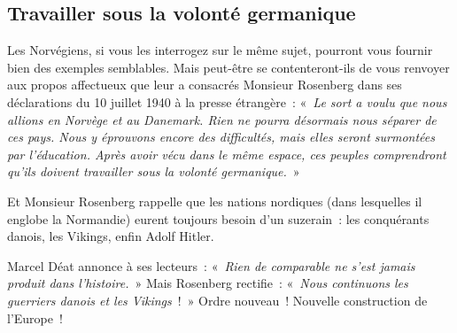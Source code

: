 \documentclass[french,twoside]{book} %
\begin{document}
\subsection[Travailler sous la volonté germanique]{Travailler sous la volonté germanique}
\noindent Les Norvégiens, si vous les interrogez sur le même sujet, pourront vous fournir bien des exemples semblables. Mais peut-être se contenteront-ils de vous renvoyer aux propos affectueux que leur a consacrés Monsieur Rosenberg dans ses déclarations du 10 juillet 1940 à la presse étrangère : « \emph{Le sort a voulu que nous allions en Norvège et au Danemark. Rien ne pourra désormais nous séparer de ces pays. Nous y éprouvons encore des difficultés, mais elles seront surmontées par l’éducation. Après avoir vécu dans le même espace, ces peuples comprendront qu’ils doivent travailler sous la volonté germanique.} »\par
Et Monsieur Rosenberg rappelle que les nations nordiques (dans lesquelles il englobe la Normandie) eurent toujours besoin d’un suzerain : les conquérants danois, les Vikings, enfin Adolf Hitler.\par
Marcel Déat annonce à ses lecteurs : « \emph{Rien de comparable ne s’est jamais produit dans l’histoire.} » Mais Rosenberg rectifie : « \emph{Nous continuons les guerriers danois et les Vikings} ! » Ordre nouveau ! Nouvelle construction de l’Europe !
\end{document}
